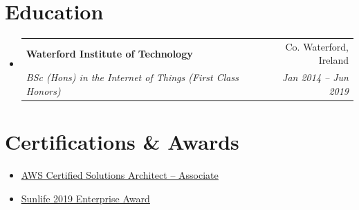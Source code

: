 \documentclass[a4paper,11pt]{article}
\makeatletter
\newcommand{\resumeItem}[1]{
  \item\small{#1}
}
\newcommand{\resumeItemListStart}{\begin{itemize}[rightmargin=0.11in]}
\newcommand{\resumeItemListEnd}{\end{itemize}}
\newcommand{\resumeQuadHeading}[4]{
  \item
  \begin{tabular*}{0.96\textwidth}[t]{l@{\extracolsep{\fill}}r}
    \textbf{#1} & #2 \\
    \textit{\small#3} & \textit{\small #4} \\
  \end{tabular*}
}
\newcommand{\resumeHeadingListStart}{
  \begin{itemize}[leftmargin=0.15in, label={}]
}
\newcommand{\resumeHeadingListEnd}{\end{itemize}}
\makeatother
\begin{document}

\section{Education}
  \resumeHeadingListStart{}
    \resumeQuadHeading{Waterford Institute of Technology}{Co. Waterford, Ireland}
    {BSc (Hons) in the Internet of Things (First Class Honors)}{Jan 2014 -- Jun 2019}
  \resumeHeadingListEnd{}



\section{Certifications \& Awards}
  \resumeItemListStart{}
    \resumeItem{\href{https://www.credly.com/badges/1c32c717-2f94-42cf-af07-e31498b86558}{\uline{AWS Certified Solutions Architect – Associate}}}
    \resumeItem{\href{https://www.credly.com/badges/1c32c717-2f94-42cf-af07-e31498b86558}{\uline{Sunlife 2019 Enterprise Award}}}
  \resumeItemListEnd{}
\end{document}
